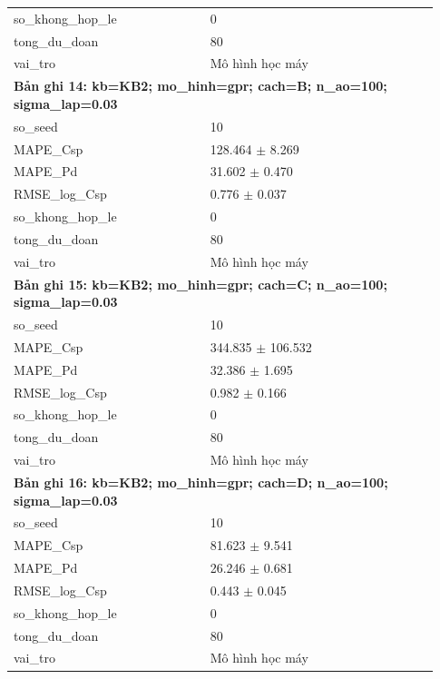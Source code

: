 \begin{longtable}{p{0.43\linewidth}p{0.50\linewidth}}
so\_\allowbreak khong\_\allowbreak hop\_\allowbreak le & 0 \\
tong\_\allowbreak du\_\allowbreak doan & 80 \\
vai\_\allowbreak tro & Mô hình học máy \\
\midrule
\multicolumn{2}{p{0.95\linewidth}}{\textbf{Bản ghi 14: kb=KB2; mo\_hinh=gpr; cach=B; n\_ao=100; sigma\_lap=0.03}} \\
so\_\allowbreak seed & 10 \\
MAPE\_\allowbreak Csp & 128.464 $\pm$ 8.269 \\
MAPE\_\allowbreak Pd & 31.602 $\pm$ 0.470 \\
RMSE\_\allowbreak log\_\allowbreak Csp & 0.776 $\pm$ 0.037 \\
so\_\allowbreak khong\_\allowbreak hop\_\allowbreak le & 0 \\
tong\_\allowbreak du\_\allowbreak doan & 80 \\
vai\_\allowbreak tro & Mô hình học máy \\
\midrule
\multicolumn{2}{p{0.95\linewidth}}{\textbf{Bản ghi 15: kb=KB2; mo\_hinh=gpr; cach=C; n\_ao=100; sigma\_lap=0.03}} \\
so\_\allowbreak seed & 10 \\
MAPE\_\allowbreak Csp & 344.835 $\pm$ 106.532 \\
MAPE\_\allowbreak Pd & 32.386 $\pm$ 1.695 \\
RMSE\_\allowbreak log\_\allowbreak Csp & 0.982 $\pm$ 0.166 \\
so\_\allowbreak khong\_\allowbreak hop\_\allowbreak le & 0 \\
tong\_\allowbreak du\_\allowbreak doan & 80 \\
vai\_\allowbreak tro & Mô hình học máy \\
\midrule
\multicolumn{2}{p{0.95\linewidth}}{\textbf{Bản ghi 16: kb=KB2; mo\_hinh=gpr; cach=D; n\_ao=100; sigma\_lap=0.03}} \\
so\_\allowbreak seed & 10 \\
MAPE\_\allowbreak Csp & 81.623 $\pm$ 9.541 \\
MAPE\_\allowbreak Pd & 26.246 $\pm$ 0.681 \\
RMSE\_\allowbreak log\_\allowbreak Csp & 0.443 $\pm$ 0.045 \\
so\_\allowbreak khong\_\allowbreak hop\_\allowbreak le & 0 \\
tong\_\allowbreak du\_\allowbreak doan & 80 \\
vai\_\allowbreak tro & Mô hình học máy \\

\end{longtable}
